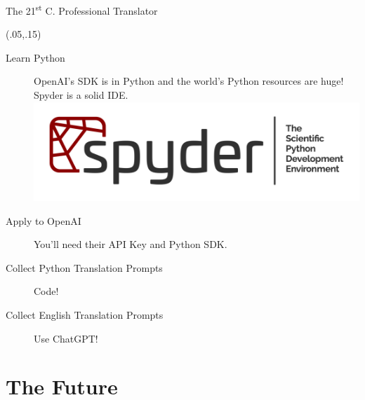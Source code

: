 \documentclass{beamer}
\begin{document}
\begin{frame}{The 21\textsuperscript{st}  C. Professional Translator}

\begin{textblock}{1}(.05,.15)
\begin{description}
  \item [Learn Python] OpenAI's SDK is in Python and the world's Python resources are huge! Spyder is a solid IDE.
  \includegraphics [scale=.05]{graphics/Spyder.png}
  \item [Apply to OpenAI] You'll need their API Key and Python SDK.
  \item [Collect Python Translation Prompts] Code!
  \item [Collect English Translation Prompts] Use ChatGPT!
  
\end{description}
\end{textblock}

\end{frame}

\section{The Future}
\end{document}
